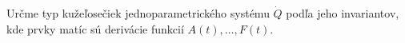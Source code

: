 %
Určme typ kužeľosečiek jednoparametrického systému $\dot{Q}$ podľa jeho invariantov, kde prvky matíc sú derivácie funkcií $A(t), \dots, F(t).$ 
